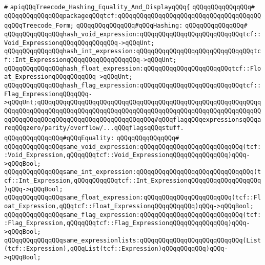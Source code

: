 \verb|#|\newline
\verb|apiqQQqTreecode_Hashing_Equality_And_DisplayqQQq{|\newline
\verb|qQQqqQQqqQQqqQQq#|\newline
\verb|qQQqqQQqqQQqqQQqpackageqQQqtcf:qQQqqQQqqQQqqQQqqQQqqQQqqQQqqQQqqQQqqQQqqQQqTreecode_Form;|\newline
\newline
\verb|qQQqqQQqqQQqqQQq#qQQqHashing:|\newline
\verb|qQQqqQQqqQQqqQQq#|\newline
\verb|qQQqqQQqqQQqqQQqhash_void_expression:qQQqqQQqqQQqqQQqqQQqqQQqqQQqtcf::Void_ExpressionqQQqqQQqqQQqqQQq->qQQqUnt;|\newline
\verb|qQQqqQQqqQQqqQQqhash_int_expression:qQQqqQQqqQQqqQQqqQQqqQQqqQQqqQQqtcf::Int_ExpressionqQQqqQQqqQQqqQQqqQQq->qQQqUnt;|\newline
\verb|qQQqqQQqqQQqqQQqhash_float_expression:qQQqqQQqqQQqqQQqqQQqqQQqtcf::Float_ExpressionqQQqqQQqqQQq->qQQqUnt;|\newline
\verb|qQQqqQQqqQQqqQQqhash_flag_expression:qQQqqQQqqQQqqQQqqQQqqQQqqQQqtcf::Flag_ExpressionqQQqqQQq->qQQqUnt;qQQqqQQqqQQqqQQqqQQqqQQqqQQqqQQqqQQqqQQqqQQqqQQqqQQqqQQqqQQqqQQqqQQqqQQqqQQqqQQqqQQqqQQqqQQqqQQqqQQqqQQqqQQqqQQqqQQqqQQqqQQqqQQqqQQqqQQqqQQqqQQqqQQqqQQqqQQqqQQqqQQqqQQqqQQq#qQQqflagqQQqexpressionsqQQqareqQQqzero/parity/overflow/...qQQqflagsqQQqstuff.|\newline
\newline
\newline
\verb|qQQqqQQqqQQqqQQq#qQQqEquality:|\newline
\verb|qQQqqQQqqQQqqQQq#|\newline
\verb|qQQqqQQqqQQqqQQqsame_void_expression:qQQqqQQqqQQqqQQqqQQqqQQqqQQq(tcf::Void_Expression,qQQqqQQqtcf::Void_ExpressionqQQqqQQqqQQqqQQq)qQQq->qQQqBool;|\newline
\verb|qQQqqQQqqQQqqQQqsame_int_expression:qQQqqQQqqQQqqQQqqQQqqQQqqQQqqQQq(tcf::Int_Expression,qQQqqQQqqQQqtcf::Int_ExpressionqQQqqQQqqQQqqQQqqQQq)qQQq->qQQqBool;|\newline
\verb|qQQqqQQqqQQqqQQqsame_float_expression:qQQqqQQqqQQqqQQqqQQqqQQq(tcf::Float_Expression,qQQqtcf::Float_ExpressionqQQqqQQqqQQq)qQQq->qQQqBool;|\newline
\verb|qQQqqQQqqQQqqQQqsame_flag_expression:qQQqqQQqqQQqqQQqqQQqqQQqqQQq(tcf::Flag_Expression,qQQqqQQqtcf::Flag_ExpressionqQQqqQQqqQQqqQQq)qQQq->qQQqBool;|\newline
\verb|qQQqqQQqqQQqqQQqsame_expressionlists:qQQqqQQqqQQqqQQqqQQqqQQqqQQq(List(tcf::Expression),qQQqList(tcf::Expression)qQQqqQQqqQQq)qQQq->qQQqBool;|\newline
